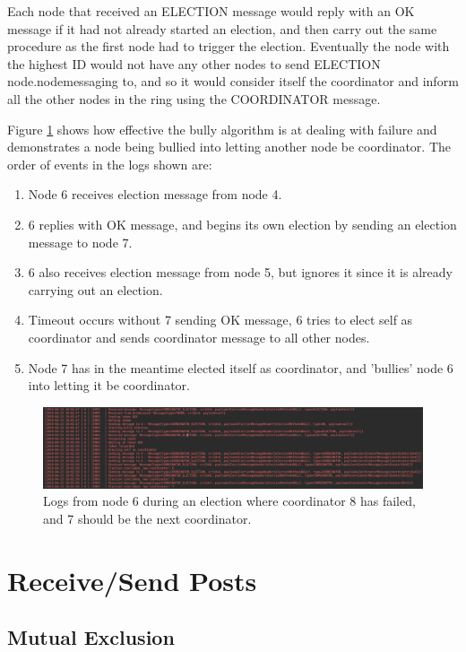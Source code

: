 \documentclass[12pt]{article}
\begin{document}
Each node that received an ELECTION message would reply with an OK message if it had not already started an election, and then carry out the same procedure as the first node had to trigger the election. Eventually the node with the highest ID would not have any other nodes to send ELECTION node.nodemessaging to, and so it would consider itself the coordinator and inform all the other nodes in the ring using the COORDINATOR message.

Figure \ref{fig:bully} shows how effective the bully algorithm is at dealing with failure and demonstrates a node being bullied into letting another node be coordinator. The order of events in the logs shown are:

\begin{enumerate}
	\item Node 6 receives election message from node 4.
	\item 6 replies with OK message, and begins its own election by sending an election message to node 7.
	\item 6 also receives election message from node 5, but ignores it since it is already carrying out an election.
	\item Timeout occurs without 7 sending OK message, 6 tries to elect self as coordinator and sends coordinator message to all other nodes.
	\item Node 7 has in the meantime elected itself as coordinator, and 'bullies' node 6 into letting it be coordinator.
\end{enumerate}

\begin{figure}[!ht]
	\centering
	\includegraphics[width=\linewidth]{images/bully}
	\caption{Logs from node 6 during an election where coordinator 8 has failed, and 7 should be the next coordinator.}
	\label{fig:bully}
\end{figure}

\section{Receive/Send Posts}

\subsection{Mutual Exclusion}
\end{document}
